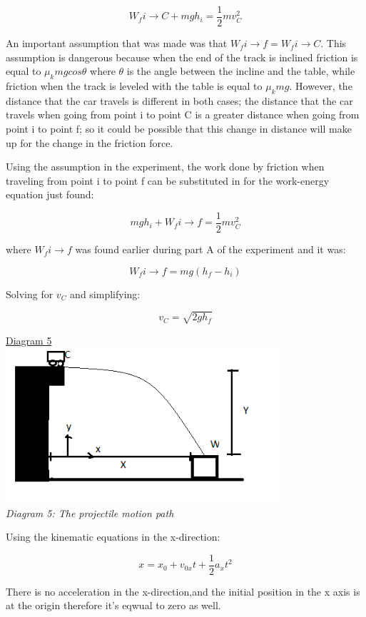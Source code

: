 \documentclass[aps,letterpaper,11pt]{revtex4}
\begin{document}
$$ W_f i \rightarrow C + mgh_i = \frac{1}{2}mv_C^2$$

An important assumption that was made was that $W_f i \rightarrow f = W_f i \rightarrow C$. This assumption is dangerous because when the end of the track is inclined friction is equal to $\mu_kmgcos\theta$ where $\theta$ is the angle between the incline and the table, while friction when the track is leveled with the table is equal to $\mu_kmg$. However, the distance that the car travels is different in both cases; the distance that the car travels when going from point i to point C is a greater distance when going from point i to point f; so it could be possible that this change in distance will make up for the change in the friction force. 

Using the assumption in the experiment, the work done by friction when traveling from point i to point f can be substituted in for the work-energy equation just found:

$$ mgh_i + W_fi \rightarrow f = \frac{1}{2}mv_C^2$$

where $W_fi \rightarrow f$ was found earlier during part A of the experiment and it was:

$$W_fi \rightarrow f = mg(h_f - h_i)$$

Solving for $v_C$ and simplifying:

$$ v_C = \sqrt{2gh_f}$$

\begin{center}
\underline{Diagram 5}\\
\includegraphics[width=4in]{ProjMotion.png}\\
\textit{Diagram 5: The projectile motion path}
\end{center}

Using the kinematic equations in the x-direction:

$$ x = x_0 +v_{0x}t + \frac{1}{2}a_xt^2$$

There is no acceleration in the x-direction,and the initial position in the x axis is at the origin therefore it's eqwual to zero as well.
\end{document}
